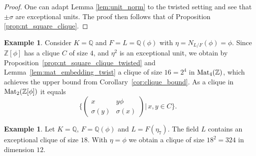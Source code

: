 \documentclass{amsart}
\theoremstyle{plain}
\newtheorem{proposition}[theorem]{Proposition}
\theoremstyle{definition}
\newtheorem{example}[theorem]{Example}
\newcommand{\Z}{\ensuremath{\mathbb{Z}}}
\newcommand{\Q}{\ensuremath{\mathbb{Q}}}
\newcommand{\clq}{C}
\begin{document}
\begin{proof}
One can adapt Lemma \ref{lem:unit_norm} to the twisted setting and see that $\pm\sigma$ are exceptional units. The proof then follows that of Proposition \ref{prop:nt_square_clique}.
\end{proof}

\begin{example}\label{ex:n4c16}
	Consider \(K=\Q\) and \(F=L=\Q(\phi)\) with \(\eta=N_{L/F}(\phi)=\phi\).
	Since \(\Z[\phi]\) has a clique \(\clq\) of size \(4\), and \(\eta^2\) is an exceptional unit, we obtain by Proposition~\ref{prop:nt_square_clique_twisted} and Lemma~\ref{lem:mat_embedding_twist} a clique of size \(16=2^4\) in \(\textup{Mat}_{4}(\Z)\), which achieves the upper bound from Corollary~\ref{cor:clique_bound}. 
	As a clique in \(\textup{Mat}_2(\Z[\phi])\) it equals
	\[\Big\{\begin{pmatrix} x & y\phi \\ \sigma(y) & \sigma(x) \end{pmatrix} \Big|\, x,y\in \clq\Big\}.\]
\end{example}

\begin{example}\label{ex:n12c324}
	Let \(K=\Q\), \(F=\Q(\phi)\) and \(L=F(\eta_7)\). 
	The field \(L\) contains an exceptional clique of size \(18\).
	With \(\eta=\phi\) we obtain a clique of size \(18^2=324\) in dimension \(12\).
\end{example}

\end{document}
